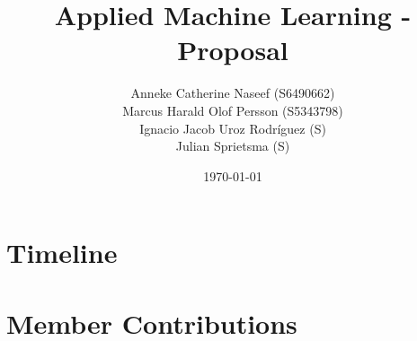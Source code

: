 \documentclass{article}
\title{\textbf{Applied Machine Learning - Proposal}}
\author{
        Anneke Catherine Naseef (S6490662) \\
        Marcus Harald Olof Persson (S5343798) \\
        Ignacio Jacob Uroz Rodríguez (S) \\
        Julian Sprietsma (S) \\
}
\date{\today}
\begin{document}
\maketitle



\section{Timeline}


\section{Member Contributions}
\end{document}
